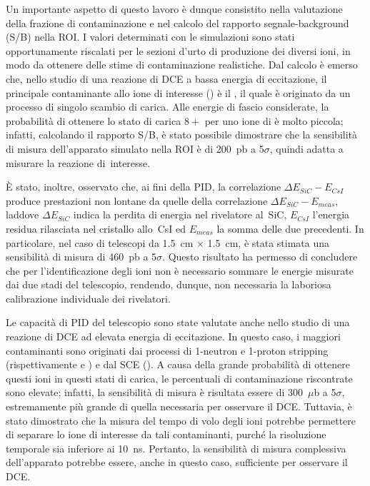 Un importante aspetto di questo lavoro è dunque consistito nella valutazione della frazione di contaminazione e nel calcolo del rapporto segnale-background (S/B) nella ROI. 
I valori determinati con le simulazioni sono stati opportunamente riscalati per le sezioni d'urto di produzione dei diversi ioni, in modo da ottenere delle stime di contaminazione realistiche.
Dal calcolo è emerso che, nello studio di una reazione di DCE a bassa energia di eccitazione, il principale contaminante allo ione di interesse () è il , il quale è originato da un processo di singolo scambio di carica. 
Alle energie di fascio considerate, la probabilità di ottenere lo stato di carica $8+$ per uno ione di  è molto piccola; infatti, calcolando il rapporto S/B, è stato possibile dimostrare che la sensibilità di misura dell'apparato simulato nella ROI è di 200~pb a 5$\sigma$, quindi adatta a misurare la reazione di~interesse.


È stato, inoltre, osservato che, ai fini della PID, la correlazione $\Delta E_{SiC} - E_{CsI}$ produce prestazioni non lontane da quelle della correlazione $\Delta E_{SiC} - E_{meas}$, laddove $\Delta E_{SiC}$ indica la perdita di energia nel rivelatore al~SiC, $E_{CsI}$ l'energia residua rilasciata nel cristallo allo~CsI ed $E_{meas}$ la somma delle due precedenti.
In particolare, nel caso di telescopi da 1.5~cm $\times$ 1.5~cm, è stata stimata una sensibilità di misura di 460~pb a 5$\sigma$.
Questo risultato ha permesso di concludere che per l'identificazione degli ioni non è necessario sommare le energie misurate dai due stadi del telescopio, rendendo, dunque, non necessaria la laboriosa calibrazione individuale dei rivelatori.

Le capacità di PID del telescopio sono state valutate anche nello studio di una reazione di DCE ad elevata energia di eccitazione.
In questo caso, i maggiori contaminanti sono originati dai processi di 1-neutron e 1-proton stripping (rispettivamente  e ) e dal SCE ().
A causa della grande probabilità di ottenere questi ioni in questi stati di carica, le percentuali di contaminazione riscontrate sono elevate; infatti, la sensibilità di misura è risultata essere di 300~$\mu$b a 5$\sigma$, estremamente più grande di quella necessaria per osservare il DCE.
Tuttavia, è stato dimostrato che la misura del tempo di volo degli ioni potrebbe permettere di separare lo ione di interesse da tali contaminanti, purché la risoluzione temporale sia inferiore ai 10~ns.
Pertanto, la sensibilità di misura complessiva dell'apparato potrebbe essere, anche in questo caso, sufficiente per osservare il DCE.


